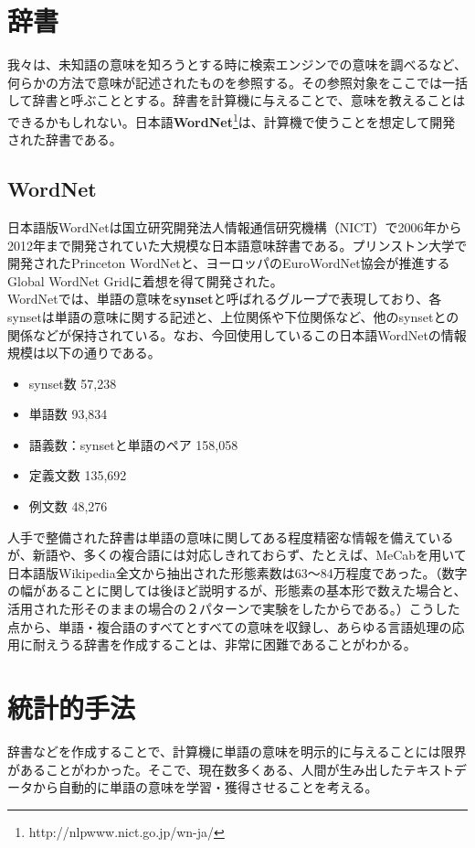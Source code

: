 \section{辞書}
我々は、未知語の意味を知ろうとする時に検索エンジンでの意味を調べるなど、何らかの方法で意味が記述されたものを参照する。その参照対象をここでは一括して辞書と呼ぶこととする。辞書を計算機に与えることで、意味を教えることはできるかもしれない。日本語\textbf{WordNet}\footnote{http://nlpwww.nict.go.jp/wn-ja/}は、計算機で使うことを想定して開発された辞書である。

\subsection{WordNet}
日本語版WordNetは国立研究開発法人情報通信研究機構（NICT）で2006年から2012年まで開発されていた大規模な日本語意味辞書である。プリンストン大学で開発されたPrinceton WordNetと、ヨーロッパのEuroWordNet協会が推進するGlobal WordNet Gridに着想を得て開発された。\\
WordNetでは、単語の意味を\textbf{synset}と呼ばれるグループで表現しており、各synsetは単語の意味に関する記述と、上位関係や下位関係など、他のsynsetとの関係などが保持されている。なお、今回使用しているこの日本語WordNetの情報規模は以下の通りである。\cite{j_WordNet}
\begin{itemize}
  \item{synset数} 57,238
  \item{単語数} 93,834
  \item{語義数：synsetと単語のペア} 158,058
  \item{定義文数} 135,692
  \item{例文数} 48,276
\end{itemize}

人手で整備された辞書は単語の意味に関してある程度精密な情報を備えているが、新語や、多くの複合語には対応しきれておらず、たとえば、MeCabを用いて日本語版Wikipedia全文から抽出された形態素数は63〜84万程度であった。（数字の幅があることに関しては後ほど説明するが、形態素の基本形で数えた場合と、活用された形そのままの場合の２パターンで実験をしたからである。）こうした点から、単語・複合語のすべてとすべての意味を収録し、あらゆる言語処理の応用に耐えうる辞書を作成することは、非常に困難であることがわかる。

\newpage

\section{統計的手法}
辞書などを作成することで、計算機に単語の意味を明示的に与えることには限界があることがわかった。そこで、現在数多くある、人間が生み出したテキストデータから自動的に単語の意味を学習・獲得させることを考える。

